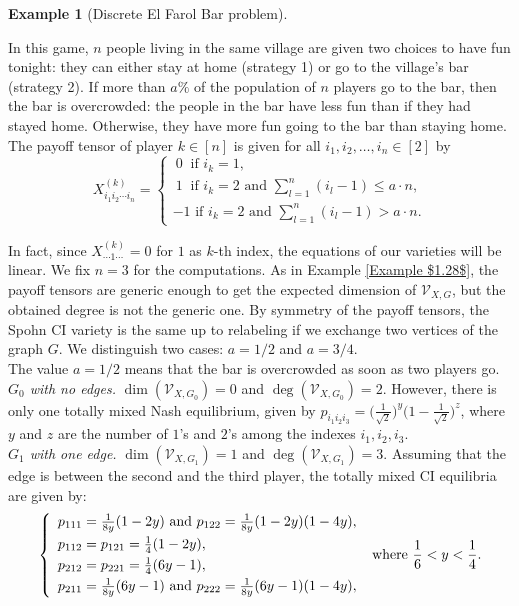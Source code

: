 \documentclass[11pt]{amsart}
\numberwithin{equation}{section}
\theoremstyle{plain}
\numberwithin{theorem}{section}
\theoremstyle{definition}
\newtheorem{example}[theorem]{Example}
\begin{document}
\begin{example}[Discrete El Farol Bar problem]\label{Example $1.29$}

In this game, $n$ people living in the same village are given two choices to have fun tonight: they can either stay at home (strategy 1) or go to the village's bar (strategy 2). If more than
$a \%$ of the population of $n$ players go to the bar, then the bar is overcrowded: the people in the bar have less fun than if they had stayed home. Otherwise, they have more fun going to the bar than staying home.
The payoff tensor of player $k\in[n]$ is given for all $i_1,i_2,\ldots,i_n\in[2]$ by $$X^{(k)}_{i_1i_2\cdots i_n}=\left\{\begin{array}{l}
      ~0~\text{ if }i_k=1,\\
      ~\displaystyle1~\text{ if }i_k=2\text{ and }\sum_{l=1}^n(i_l-1)\le a\cdot n,\\
      \displaystyle-1\text{ if }i_k=2\text{ and }\sum_{l=1}^n(i_l-1)>a\cdot n.
\end{array}\right.$$

\noindent In fact, since $X_{\cdots1\cdots}^{(k)}=0$ for $1$ as $k$-th index, the equations of our varieties will be linear. We fix $n=3$ for the computations. As in Example \ref{Example $1.28$}, the payoff tensors are generic enough to get the expected dimension of $\mathcal V_{X,G}$, but the obtained degree is not the generic one. By symmetry of the payoff tensors, the Spohn CI variety is the same up to relabeling if we exchange two vertices of the graph $G$. We distinguish two cases: $a=1/2$ and $a=3/4$. \\


\noindent The value $a=1/2$ means that the bar is overcrowded as soon as two players go.\\
\indent \emph{$G_0$ with no edges.} $\dim(\mathcal V_{X,G_0})=0$ and $\deg(\mathcal V_{X,G_0})=2$. However, there is only one totally mixed Nash equilibrium, given by $p_{i_1i_2i_3}=\big(\frac1{\sqrt2}\big)^y\big(1-\frac1{\sqrt2}\big)^z$, where $y$ and $z$ are the number of $1$'s and $2$'s among the indexes $i_1,i_2,i_3$.\\
\indent \emph{$G_1$ with one edge.} $\dim(\mathcal V_{X,G_1})=1$ and $\deg(\mathcal V_{X,G_1})=3$. Assuming that the edge is between the second and the third player, the totally mixed CI equilibria are given by: $$\left\{\begin{array}{l}
   \vspace*{1mm}  p_{111}=\frac1{8y}(1-2y)\text{ and }p_{122}=\frac1{8y}(1-2y)(1-4y),\\
   \vspace*{1mm}  p_{112}=p_{121}=\frac14(1-2y),\\
  \vspace*{1mm}   p_{212}=p_{221}=\frac14(6y-1),\\
      p_{211}=\frac1{8y}(6y-1)\text{ and }p_{222}=\frac1{8y}(6y-1)(1-4y),
\end{array}\right.\text{ where }\frac16<y<\frac14.$$


\end{example}
\end{document}

